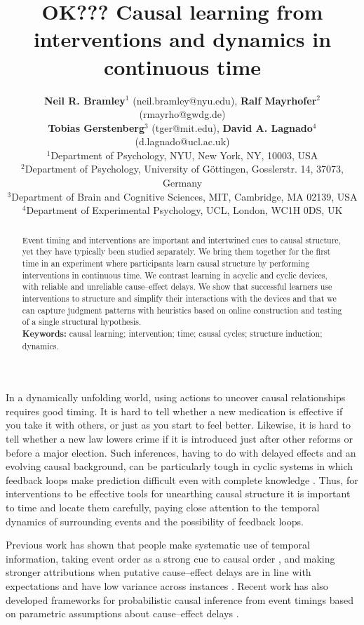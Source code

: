 \documentclass[10pt,letterpaper]{article}
\title{OK??? Causal learning from interventions and dynamics in continuous time}
\author{{\large \textbf{Neil R. Bramley$^1$} (neil.bramley@nyu.edu)}, {\large \textbf{Ralf Mayrhofer$^2$} (rmayrho@gwdg.de)}\\{\large \textbf{Tobias Gerstenberg$^3$} (tger@mit.edu), {\large \textbf{David A. Lagnado$^4$} (d.lagnado@ucl.ac.uk)}}\\
{\footnotesize$^1$Department of Psychology, NYU, New York, NY, 10003, USA}\\
{\footnotesize$^2$Department of Psychology, University of G{\"o}ttingen, Gosslerstr. 14, 37073, Germany}\\
{\footnotesize$^3$Department of Brain and Cognitive Sciences, MIT, Cambridge, MA 02139, USA}\\
{\footnotesize$^4$Department of Experimental Psychology, UCL, London, WC1H 0DS, UK}
}
\begin{document}
\maketitle

\begin{abstract}
Event timing and interventions are important and intertwined cues to causal structure, yet they have typically been studied separately.  We bring them together for the first time in an experiment where participants learn causal structure by performing interventions in continuous time.  We contrast learning in acyclic and cyclic devices, with reliable and unreliable cause--effect delays.  We show that successful learners use interventions to structure and simplify their interactions with the devices and that we can capture judgment patterns with heuristics based on online construction and testing of a single structural hypothesis.\\
\textbf{Keywords:} 
causal learning; intervention; time; causal cycles; structure induction; dynamics.
\end{abstract}

In a dynamically unfolding world, using actions to uncover causal relationships requires good timing.  It is hard to tell whether a new medication is effective if you take it with others, or just as you start to feel better.  Likewise, it is hard to tell whether a new law lowers crime if it is introduced just after other reforms or before a major election.  Such inferences, having to do with delayed effects and an evolving causal background, can be particularly tough in cyclic systems in which feedback loops make prediction difficult even with complete knowledge \citep{brehmer1992dynamic}.  Thus, for interventions to be effective tools for unearthing causal structure it is important to time and locate them carefully, paying close attention to the temporal dynamics of surrounding events and the possibility of feedback loops. 

Previous work has shown that people make systematic use of temporal information, taking event order as a strong cue to causal order \citep{bramley2014order}, and making stronger attributions when putative cause--effect delays are in line with expectations \citep{buehner2006temporal} and have low variance across instances \citep{greville2010temporal}. Recent work has also developed frameworks for probabilistic causal inference from event timings based on parametric assumptions about cause--effect delays \citep{bramley2017time,pacer2015upsetting}.
\end{document}
